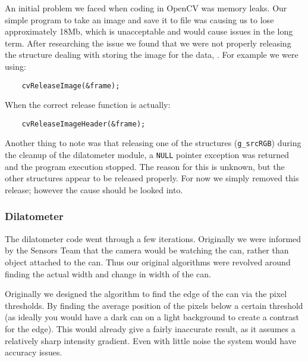 An initial problem we faced when coding in OpenCV was memory leaks.  Our simple program to take an image and save it to file was causing us to lose approximately 18Mb, which is unacceptable and would cause issues in the long term.  After researching the issue we found that we were not properly releasing the structure dealing with storing the image for the data, .  For example we were using:
\begin{lstlisting}
	cvReleaseImage(&frame);
\end{lstlisting}
When the correct release function is actually:
\begin{lstlisting}
	cvReleaseImageHeader(&frame);
\end{lstlisting}

Another thing to note was that releasing one of the  structures (\verb/g_srcRGB/) during the cleanup of the dilatometer module, a \verb/NULL/ pointer exception was returned and the program execution stopped.  The reason for this is unknown, but the other  structures appear to be released properly. For now we simply removed this release; however the cause should be looked into.

\subsubsection{Dilatometer}
The dilatometer code went through a few iterations.  Originally we were informed by the Sensors Team that the camera would be watching the can, rather than object attached to the can.  Thus our original algorithms were revolved around finding the actual width and change in width of the can.

Originally we designed the algorithm to find the edge of the can via the pixel thresholds.  By finding the average position of the pixels below a certain threshold (as ideally you would have a dark can on a light background to create a contrast for the edge). This would already give a fairly inaccurate result, as it assumes a relatively sharp intensity gradient.  Even with little noise the system would have accuracy issues.

